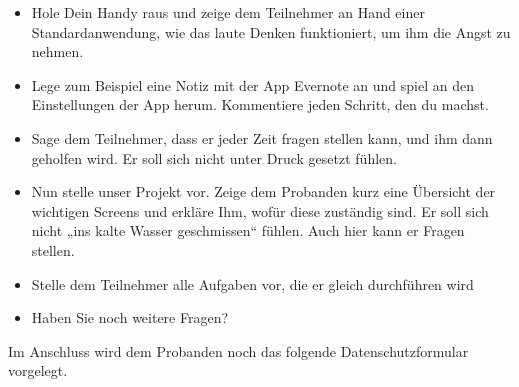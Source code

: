 \begin{itemize}
\item Hole Dein Handy raus und zeige dem Teilnehmer an Hand einer Standardanwendung, wie das laute Denken funktioniert, um ihm die Angst zu nehmen. 

\item Lege zum Beispiel eine Notiz mit der App Evernote an und spiel an den Einstellungen der App herum. Kommentiere jeden Schritt, den du machst.

\item Sage dem Teilnehmer, dass er jeder Zeit fragen stellen kann, und ihm dann geholfen wird. Er soll sich nicht unter Druck gesetzt fühlen.

\item Nun stelle unser Projekt vor. Zeige dem Probanden kurz eine Übersicht der wichtigen Screens und erkläre Ihm, wofür diese zuständig sind. Er soll sich nicht „ins kalte Wasser geschmissen“ fühlen. Auch hier kann er Fragen stellen.

\item Stelle dem Teilnehmer alle Aufgaben vor, die er gleich durchführen wird

\item Haben Sie noch weitere Fragen?
\end{itemize}

Im Anschluss wird dem Probanden noch das folgende Datenschutzformular vorgelegt.


